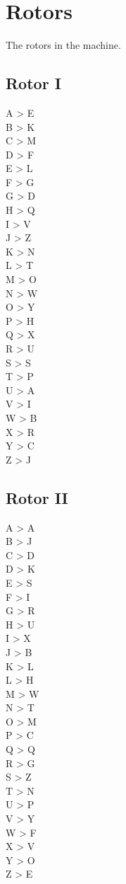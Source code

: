 \section{Rotors}

The rotors in the machine.

\begin{multicols}{2}
\subsection{Rotor I}
A > E\\
B > K\\
C > M\\
D > F\\
E > L\\
F > G\\
G > D\\
H > Q\\
I > V\\
J > Z\\
K > N\\
L > T\\
M > O\\
N > W\\
O > Y\\
P > H\\
Q > X\\
R > U\\
S > S\\
T > P\\
U > A\\
V > I\\
W > B\\
X > R\\
Y > C\\
Z > J\\

\subsection{Rotor II}
A > A\\
B > J\\
C > D\\
D > K\\
E > S\\
F > I\\
G > R\\
H > U\\
I > X\\
J > B\\
K > L\\
L > H\\
M > W\\
N > T\\
O > M\\
P > C\\
Q > Q\\
R > G\\
S > Z\\
T > N\\
U > P\\
V > Y\\
W > F\\
X > V\\
Y > O\\
Z > E\\


\end{multicols}
